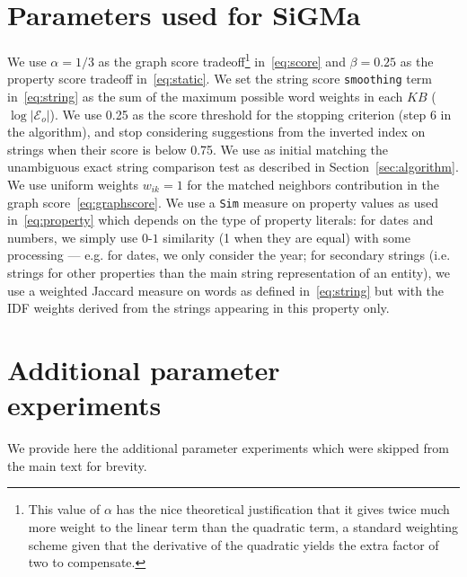\documentclass{sig-alternate}
\newcommand{\KB}{K\!B}
\begin{document}
\begin{appendix}
\section{Parameters used for SiGMa} \label{ap:params}
We use $\alpha=1/3$ as the graph score tradeoff\footnote{This value of $\alpha$ has the nice theoretical justification that it gives twice much more weight to the linear term than the quadratic term, a standard weighting scheme given that the derivative of the quadratic yields the extra factor of two to compensate.}
in~\eqref{eq:score} and $\beta=0.25$ as the property score tradeoff in~\eqref{eq:static}. We set the string score \texttt{smoothing} term in~\eqref{eq:string} as the sum of the maximum possible word weights in each $\KB$ ($\log |\mathcal{E}_o|$). We use 0.25 as the score threshold for the stopping criterion (step 6 in the algorithm), and stop considering suggestions from the inverted index on strings when their score is below 0.75. We use as initial matching the unambiguous exact string comparison test as described in Section~\ref{sec:algorithm}. We use uniform weights $w_{ik} = 1$ for the matched neighbors contribution in the graph score~\eqref{eq:graphscore}.  We use a \texttt{Sim} measure on property values as used in~\eqref{eq:property} which depends on the type of property literals: for dates and numbers, we simply use $0$-$1$ similarity (1 when they are equal) with some processing --- e.g. for dates, we only consider the year; for secondary strings (i.e. strings for other properties than the main string representation of an entity), we use a weighted Jaccard measure on words as defined in~\eqref{eq:string} but with the IDF weights derived from the strings appearing in this property only.

\section{Additional parameter \\experiments} \label{ap:param_exp}
We provide here the additional parameter experiments which were skipped from the main text for brevity.


\end{appendix}
\end{document}
